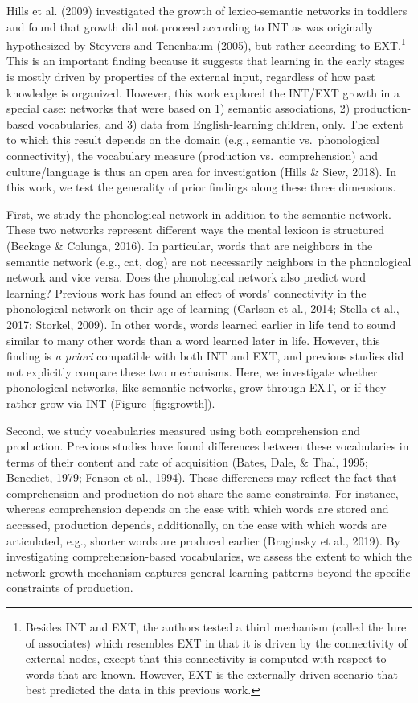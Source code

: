 \documentclass[english,floatsintext,man]{apa6}
\theoremstyle{definition}
\theoremstyle{definition}
\theoremstyle{definition}
\theoremstyle{remark}
\begin{document}
Hills et al. (2009) investigated the growth of lexico-semantic networks
in toddlers and found that growth did not proceed according to INT as
was originally hypothesized by Steyvers and Tenenbaum (2005), but rather
according to
EXT.\footnote{Besides INT and EXT, the authors tested a third mechanism (called the lure of associates) which resembles EXT in that it is driven by the connectivity of external nodes, except that this connectivity is computed with respect to words that are known. However, EXT is the externally-driven scenario that best predicted the data in this previous work.}
This is an important finding because it suggests that learning in the
early stages is mostly driven by properties of the external input,
regardless of how past knowledge is organized. However, this work
explored the INT/EXT growth in a special case: networks that were based
on 1) semantic associations, 2) production-based vocabularies, and 3)
data from English-learning children, only. The extent to which this
result depends on the domain (e.g., semantic vs.~phonological
connectivity), the vocabulary measure (production vs.~comprehension) and
culture/language is thus an open area for investigation (Hills \& Siew,
2018). In this work, we test the generality of prior findings along
these three dimensions.

First, we study the phonological network in addition to the semantic
network. These two networks represent different ways the mental lexicon
is structured (Beckage \& Colunga, 2016). In particular, words that are
neighbors in the semantic network (e.g., cat, dog) are not necessarily
neighbors in the phonological network and vice versa. Does the
phonological network also predict word learning? Previous work has found
an effect of words' connectivity in the phonological network on their
age of learning (Carlson et al., 2014; Stella et al., 2017; Storkel,
2009). In other words, words learned earlier in life tend to sound
similar to many other words than a word learned later in life. However,
this finding is \emph{a priori} compatible with both INT and EXT, and
previous studies did not explicitly compare these two mechanisms. Here,
we investigate whether phonological networks, like semantic networks,
grow through EXT, or if they rather grow via INT
(Figure~\ref{fig:growth}).

Second, we study vocabularies measured using both comprehension and
production. Previous studies have found differences between these
vocabularies in terms of their content and rate of acquisition (Bates,
Dale, \& Thal, 1995; Benedict, 1979; Fenson et al., 1994). These
differences may reflect the fact that comprehension and production do
not share the same constraints. For instance, whereas comprehension
depends on the ease with which words are stored and accessed, production
depends, additionally, on the ease with which words are articulated,
e.g., shorter words are produced earlier (Braginsky et al., 2019). By
investigating comprehension-based vocabularies, we assess the extent to
which the network growth mechanism captures general learning patterns
beyond the specific constraints of production.
\end{document}
